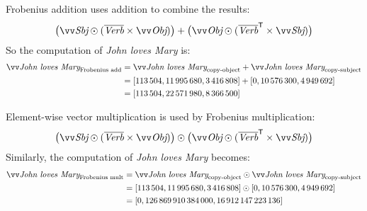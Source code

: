 Frobenius addition uses addition to combine the results:
\begin{equation*}
  \big(\ov{\text{\it Sbj}} \odot (\overline{\text{\it Verb}} \times \ov{\text{\it Obj}})\big) + %
  \big(\ov{\text{\it Obj}} \odot (\overline{\text{\it Verb}}^{\mathsf{T}} \times \ov{\text{\it Sbj}})\big)
\end{equation*}
%
So the computation of \textit{John loves Mary} is:
%
\begin{align*}
  \ov{\text{\it John loves Mary}}_{\text{Frobenius add}} &=  \ov{\text{\it John loves Mary}}_{\text{copy-object}} +  \ov{\text{\it John loves Mary}}_{\text{copy-subject}}\\
                                                         &= [113\,504, 11\,995\,680,  3\,416\,808] + [0, 10\,576\,300,  4\,949\,692] \\
                                                         &= [113\,504, 22\,571\,980,  8\,366\,500]
\end{align*}

Element-wise vector multiplication is used by Frobenius multiplication:%
\begin{equation*}
  \big(\ov{\text{\it Sbj}} \odot (\overline{\text{\it Verb}} \times \ov{\text{\it Obj}})\big) \odot %
  \big(\ov{\text{\it Obj}} \odot (\overline{\text{\it Verb}}^{\mathsf{T}} \times \ov{\text{\it Sbj}})\big)
\end{equation*}
%
Similarly, the computation of \textit{John loves Mary} becomes:
%
\begin{align*}
  \ov{\text{\it John loves Mary}}_{\text{Frobenius mult}} &=  \ov{\text{\it John loves Mary}}_{\text{copy-object}} \odot \ov{\text{\it John loves Mary}}_{\text{copy-subject}}\\
                                                         &= [113\,504, 11\,995\,680,  3\,416\,808] \odot [0, 10\,576\,300,  4\,949\,692] \\
                                                         &= [0, 126\,869\,910\,384\,000,  16\,912\,147\,223\,136]
\end{align*}

